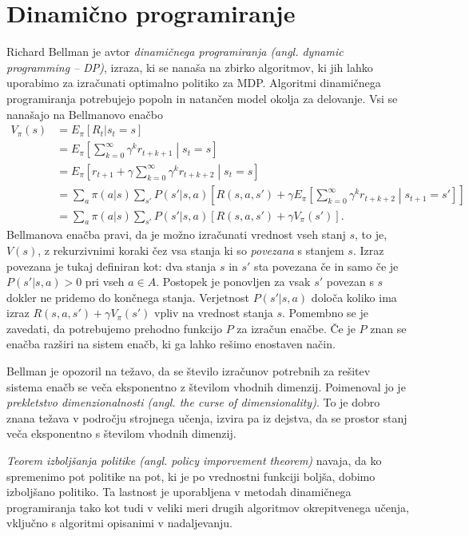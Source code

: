 \documentclass[a4paper, oneside, 12pt]{report}
\begin{document}
\section{Dinamično programiranje}
Richard Bellman je avtor {\em dinamičnega programiranja (angl. dynamic programming -- DP)}, izraza, ki se nanaša na zbirko algoritmov, ki jih lahko uporabimo za izračunati optimalno politiko za MDP. Algoritmi dinamičnega programiranja potrebujejo popoln in natančen model okolja za delovanje. Vsi se nanašajo na Bellmanovo enačbo \cite{OnTheTheoryOfDynamicProgramming}
\begin{align}
V_\pi(s) &= E_\pi[R_t | s_t = s] \nonumber \\
&= E_\pi\left[\sum_{k=0}^\infty \gamma^k r_{t+k+1} \middle| s_t = s\right] \nonumber \\
&= E_\pi\left[r_{t+1} + \gamma \sum_{k=0}^\infty \gamma^k r_{t+k+2} \middle| s_t = s \right] \nonumber \\
&= \sum_a \pi(a | s) \sum_{s'} P(s' | s, a) \left[R(s, a, s') + \gamma E_\pi\left[\sum_{k=0}^\infty \gamma^k r_{t+k+2} \middle| s_{t+1} = s' \right]\right] \nonumber \\
&= \sum_a \pi(a | s) \sum_{s'} P(s' | s, a) \left[R(s, a, s') + \gamma V_\pi(s')\right]. \label{equation:Bellman}
\end{align}
Bellmanova enačba pravi, da je možno izračunati vrednost vseh stanj $s$, to je, $V(s)$, z rekurzivnimi koraki čez vsa stanja ki so {\em povezana} s stanjem $s$. Izraz povezana je tukaj definiran kot: dva stanja $s$ in $s'$ sta povezana če in samo če je $P(s' | s, a) > 0$ pri vseh $a \in A$. Postopek je ponovljen za vsak $s'$ povezan s $s$ dokler ne pridemo do končnega stanja. Verjetnost $P(s' | s, a)$ določa koliko ima izraz $R(s, a, s') + \gamma V_\pi(s')$ vpliv na vrednost stanja $s$. Pomembno se je zavedati, da potrebujemo prehodno funkcijo $P$ za izračun enačbe. Če je $P$ znan se enačba razširi na sistem enačb, ki ga lahko rešimo enostaven način.

Bellman je opozoril na težavo, da se število izračunov potrebnih za rešitev sistema enačb se veča eksponentno z številom vhodnih dimenzij. Poimenoval jo je {\em prekletstvo dimenzionalnosti (angl. the curse of dimensionality)}. To je dobro znana težava v področju strojnega učenja, izvira pa iz dejstva, da se prostor stanj veča eksponentno s številom vhodnih dimenzij.

{\em Teorem izboljšanja politike (angl. policy imporvement theorem)} navaja, da ko spremenimo pot politike na pot, ki je po vrednostni funkciji boljša, dobimo izboljšano politiko. Ta lastnost je uporabljena v metodah dinamičnega programiranja tako kot tudi v veliki meri drugih algoritmov okrepitvenega učenja, vključno s algoritmi opisanimi v nadaljevanju.
\end{document}
